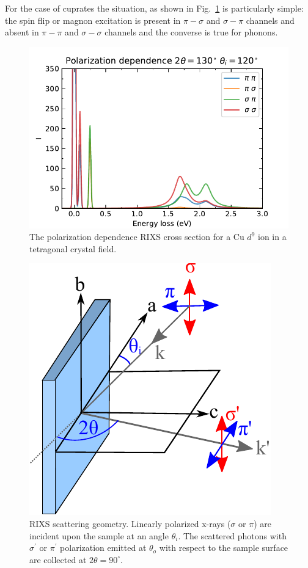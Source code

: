\documentclass[aps,onecolumn, notitlepage, longbibliography]{revtex4-1}
\begin{document}
For the case of cuprates the situation, as shown in Fig.~\ref{pol_dep} is particularly simple: the spin flip or magnon excitation is present in $\pi-\sigma$ and $\sigma-\pi$ channels and absent in $\pi-\pi$ and $\sigma-\sigma$ channels and the converse is true for phonons. 

\begin{figure}
    \includegraphics{Figs/pol_dep.pdf}
    \caption{The polarization dependence RIXS cross section for a Cu $d^9$ ion in a tetragonal crystal field. \label{pol_dep}}
\end{figure}

\begin{figure}
\includegraphics[width=1.7 in]{Figs/geometry.pdf}
\caption{RIXS scattering geometry. Linearly polarized x-rays ($\sigma$ or $\pi$) are incident upon the sample at an angle $\theta _i$. The scattered photons with $\sigma^\prime$ or $\pi^\prime$ polarization emitted at $\theta_o$ with respect to the sample surface are collected at $2\theta = 90^\circ$. \label{geometry}}
\end{figure}

\end{document}
